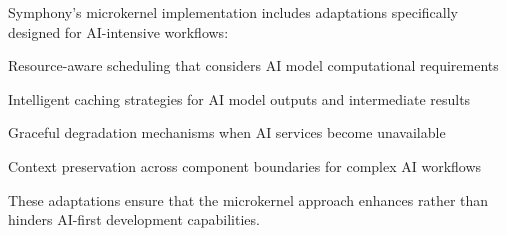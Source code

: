 Symphony's microkernel implementation includes adaptations specifically designed for AI-intensive workflows:

\begin{compactlist}
    \item Resource-aware scheduling that considers AI model computational requirements
    \item Intelligent caching strategies for AI model outputs and intermediate results
    \item Graceful degradation mechanisms when AI services become unavailable
    \item Context preservation across component boundaries for complex AI workflows
\end{compactlist}

These adaptations ensure that the microkernel approach enhances rather than hinders AI-first development capabilities.
